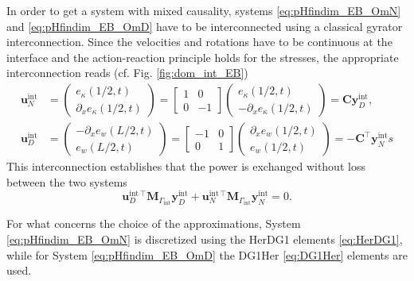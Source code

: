 In order to get a system with mixed causality, systems \eqref{eq:pHfindim_EB_OmN} and \eqref{eq:pHfindim_EB_OmD} have to be interconnected using a classical gyrator interconnection. Since the velocities and rotations have to be continuous at the interface and the action-reaction principle holds for the stresses, the appropriate interconnection reads (cf. Fig. \ref{fig:dom_int_EB})
\begin{align*}
\mathbf{u}_N^{\text{int}} &= 
\begin{pmatrix}
e_\kappa(1/2, t) \\ \partial_x e_\kappa(1/2, t)
\end{pmatrix} = 
\begin{bmatrix}
1 & 0 \\ 0 & -1
\end{bmatrix}\begin{pmatrix}
 e_\kappa(1/2, t) \\ -\partial_x e_\kappa(1/2, t)
 \end{pmatrix} = \mathbf{C} \mathbf{y}_D^{\text{int}}, \\
	\mathbf{u}_D^{\text{int}} &= 
	\begin{pmatrix}
	-\partial_x e_w(L/2, t) \\ e_w(L/2, t)
	\end{pmatrix} = 
	\begin{bmatrix}
	-1 & 0 \\ 0 & 1
	\end{bmatrix}\begin{pmatrix}
	\partial_x e_w(1/2, t) \\ e_w(1/2, t) 
	\end{pmatrix} = -\mathbf{C}^\top \mathbf{y}_N^{\text{int}}
s\end{align*}
This interconnection establishes that the power is exchanged without loss between the two systems
\begin{equation}
\mathbf{u}_D^{\text{int}\, \top} \mathbf{M}_{\Gamma_{\text{int}}} \mathbf{y}_D^{\text{int}} + \mathbf{u}_N^{\text{int}\, \top} \mathbf{M}_{\Gamma_{\text{int}}} \mathbf{y}_N^{\text{int}} = 0.
\end{equation}

For what concerns the choice of the approximations, System \eqref{eq:pHfindim_EB_OmN} is discretized using the HerDG1 elements \eqref{eq:HerDG1}, while for System \eqref{eq:pHfindim_EB_OmD} the DG1Her \eqref{eq:DG1Her} elements are used.



